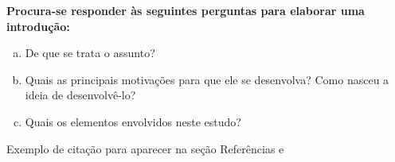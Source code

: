 \documentclass[../Main.tex]{subfiles}
\begin{document}
    \textbf{Procura-se responder às seguintes perguntas para elaborar uma introdução:}
    
    \begin{enumerate}[a)]
        \item De que se trata o assunto?
        
        \item Quais as principais motivações para que ele se desenvolva? Como nasceu a ideia de desenvolvê-lo?
        
        \item Quais os elementos envolvidos neste estudo?
    \end{enumerate}
    
    Exemplo de citação para aparecer na seção Referências \cite{correlato1} e \cite{correlato2}
\end{document}
